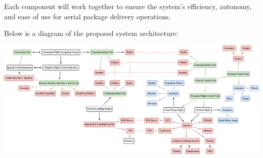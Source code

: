 \documentclass[12pt]{article}
\begin{document}
Each component will work together to ensure the system’s efficiency, autonomy, and ease of use for aerial package delivery operations.

\newpage

Below is a diagram of the proposed system architecture:

\noindent\includegraphics[width=\textwidth]{resources/system-architecture.drawio.pdf}
\end{document}
